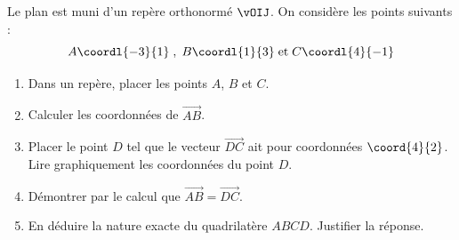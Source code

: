 \begin{exo}{}
	Le plan est muni d'un repère orthonormé $\vOIJ$. On considère les points suivants :
	\vspace*{-2mm}
	$$A\coordl{-3}{1}\;,\;B\coordl{1}{3}\;\text{et}\;C\coordl{4}{-1}$$

	\begin{enumerate}\vspace*{-3mm}
		\item Dans un repère, placer les points $A$, $B$ et $C$.
		\item Calculer les coordonnées de $\vec{AB}$.
		\item Placer le point $D$ tel que le vecteur $\vec{DC}$ ait pour coordonnées $\coord{4}{2}$. Lire graphiquement les coordonnées du point $D$.
		\item Démontrer par le calcul que $\vec{AB}=\vec{DC}$.
		\item En déduire la nature exacte du quadrilatère $ABCD$. Justifier la réponse.
	\end{enumerate}
\end{exo}
